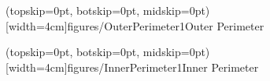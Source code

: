 \documentclass{ieeeaccess}
\begin{document}
\Figure[t!](topskip=0pt, botskip=0pt, midskip=0pt)[width=4cm]{figures/OuterPerimeter1}{Outer Perimeter\label{fig:OuterPerimeter1}}

\Figure[t!](topskip=0pt, botskip=0pt, midskip=0pt)[width=4cm]{figures/InnerPerimeter1}{Inner Perimeter\label{fig:InnerPerimeter1}}
\end{document}
